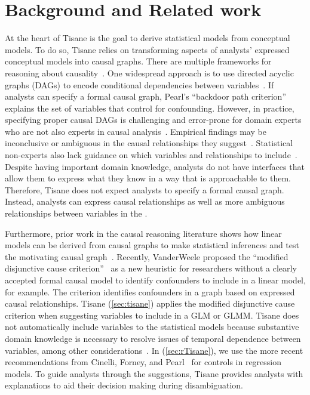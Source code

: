 \section{Background and Related work} \label{sec:relatedWorkTisane}
At the heart of Tisane is the goal to derive statistical models from conceptual
models. To do so, Tisane relies on transforming aspects of analysts' expressed
conceptual models into causal graphs. There are multiple frameworks for
reasoning about causality~\cite{rubin2004teaching,pearl1995causal}. One
widespread approach is to use directed acyclic graphs (DAGs) to encode
conditional dependencies between
variables~\cite{pearl1995doCalculus,greenland1999causal,spirtes1994conditional,spirtes1996using}.
If analysts can specify a formal causal graph, Pearl's ``backdoor path
criterion''~\cite{pearl1995causal,pearl2000models} explains the set of variables
that control for confounding. However, in practice, specifying proper causal
DAGs is challenging and error-prone for domain experts who are not also experts
in causal analysis~\cite{suzuki2020causal}. Empirical findings may be
inconclusive or ambiguous in the causal relationships they
suggest~\cite{suzuki2018mechanisms}. Statistical non-experts also lack guidance
on which variables and relationships to include~\cite{velentgas2013developing}.
Despite having important domain knowledge, analysts do not have interfaces that
allow them to express what they know in a way that is approachable to them.
Therefore, Tisane does not expect analysts to specify a formal causal graph.
Instead, analysts can express causal relationships as well as more ambiguous
relationships between variables in the \SDSLlong.

Furthermore, prior work in the causal reasoning literature shows how linear
models can be derived from causal graphs to make statistical inferences and test
the motivating causal graph~\cite{spirtes1996using,spirtes1994conditional}.
Recently, VanderWeele proposed the ``modified disjunctive cause
criterion''~\cite{vanderweele2019modifiedDisjunctiveCriterion} as a new
heuristic for researchers without a clearly accepted formal causal model to
identify confounders to include in a linear model, for example. The criterion
identifies confounders in a graph based on expressed causal relationships. Tisane (\autoref{sec:tisane}) applies the modified disjunctive
cause criterion when suggesting variables to include in a GLM or GLMM. Tisane
does not automatically include variables to the statistical models because
substantive domain knowledge is necessary to resolve issues of temporal
dependence between variables, among other
considerations~\cite{vanderweele2019modifiedDisjunctiveCriterion}. In \rTisane (\autoref{sec:rTisane}), we use the more recent
recommendations from Cinelli, Forney, and Pearl~\cite{cinelli2020controls} for
controls in regression models. To guide analysts through the suggestions, Tisane
provides analysts with explanations to aid their decision making during
disambiguation. 

